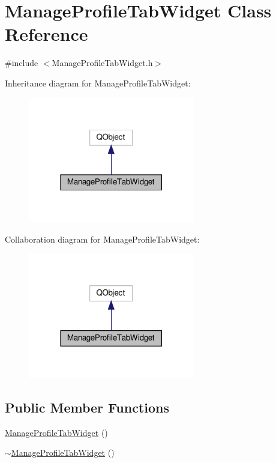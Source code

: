 \hypertarget{class_manage_profile_tab_widget}{}\section{Manage\+Profile\+Tab\+Widget Class Reference}
\label{class_manage_profile_tab_widget}


{\ttfamily \#include $<$Manage\+Profile\+Tab\+Widget.\+h$>$}



Inheritance diagram for Manage\+Profile\+Tab\+Widget\+:
\nopagebreak
\begin{figure}[H]
\begin{center}
\leavevmode
\includegraphics[width=206pt]{class_manage_profile_tab_widget__inherit__graph}
\end{center}
\end{figure}


Collaboration diagram for Manage\+Profile\+Tab\+Widget\+:
\nopagebreak
\begin{figure}[H]
\begin{center}
\leavevmode
\includegraphics[width=206pt]{class_manage_profile_tab_widget__coll__graph}
\end{center}
\end{figure}
\subsection*{Public Member Functions}
\begin{DoxyCompactItemize}
\item 
\hyperlink{class_manage_profile_tab_widget_abb60fe68d13e29251a53cfaf18db5811}{Manage\+Profile\+Tab\+Widget} ()
\item 
\hyperlink{class_manage_profile_tab_widget_a1f16db73410c81e684fccac244bb0788}{$\sim$\+Manage\+Profile\+Tab\+Widget} ()
\end{DoxyCompactItemize}


